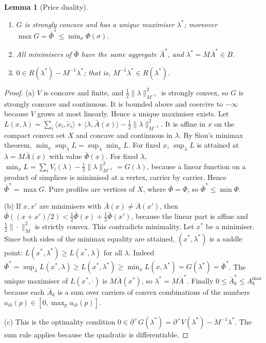 \documentclass[11pt]{article}
\newtheorem{lemma}[theorem]{Lemma}
\theoremstyle{definition}
\theoremstyle{remark}
\newcommand{\ip}[2]{\langle #1,#2\rangle}
\newcommand{\Abar}{\bar A}
\newcommand{\Amax}{A^{\max}}
\newcommand{\sd}{\partial^{+}}
\begin{document}
\begin{lemma}[Price duality]\label{lem:dual}
\begin{enumerate}[label=(\alph*)]
\item $G$ is strongly concave and has a unique maximiser $\lambda^*$; moreover $\max G=\bar\Phi^*\le\min_\sigma\Phi(\sigma)$.
\item All minimisers of $\bar\Phi$ have the same aggregate $\Abar^*$, and $\lambda^*=M\Abar^*\in B$.
\item $0\in R(\lambda^*)-M^{-1}\lambda^*$; that is, $M^{-1}\lambda^*\in R(\lambda^*)$.
\end{enumerate}
\end{lemma}
\begin{proof}
(a) $V$ is concave and finite, and $\tfrac12\|\lambda\|^2_{M^{-1}}$ is strongly convex, so $G$ is strongly concave and continuous. It is bounded above and coercive to $-\infty$ because $V$ grows at most linearly. Hence a unique maximiser exists. Let $L(x,\lambda)=\sum_i\ip{x_i}{\tilde c_i}+\ip{\lambda}{\Abar(x)}-\tfrac12\|\lambda\|^2_{M^{-1}}$. It is affine in $x$ on the compact convex set $X$ and concave and continuous in $\lambda$. By Sion's minimax theorem, $\min_x\sup_\lambda L=\sup_\lambda\min_xL$. For fixed $x$, $\sup_\lambda L$ is attained at $\lambda=M\Abar(x)$ with value $\bar\Phi(x)$. For fixed $\lambda$, $\min_xL=\sum_iV_i(\lambda)-\tfrac12\|\lambda\|^2_{M^{-1}}=G(\lambda)$, because a linear function on a product of simplices is minimised at a vertex, carrier by carrier. Hence $\bar\Phi^*=\max G$. Pure profiles are vertices of $X$, where $\bar\Phi=\Phi$, so $\bar\Phi^*\le\min\Phi$.

(b) If $x,x'$ are minimisers with $\Abar(x)\ne\Abar(x')$, then $\bar\Phi((x+x')/2)<\tfrac12\bar\Phi(x)+\tfrac12\bar\Phi(x')$, because the linear part is affine and $\tfrac12\|\cdot\|_M^2$ is strictly convex. This contradicts minimality. Let $x^*$ be a minimiser. Since both sides of the minimax equality are attained, $(x^*,\lambda^*)$ is a saddle point: $L(x^*,\lambda^*)\ge L(x^*,\lambda)$ for all $\lambda$. Indeed $\bar\Phi^*=\sup_\lambda L(x^*,\lambda)\ge L(x^*,\lambda^*)\ge\min_xL(x,\lambda^*)=G(\lambda^*)=\bar\Phi^*$. The unique maximiser of $L(x^*,\cdot)$ is $M\Abar(x^*)$, so $\lambda^*=M\Abar^*$. Finally $0\le\Abar^*_k\le\Amax_k$ because each $\Abar_k$ is a sum over carriers of convex combinations of the numbers $a_{ik}(p)\in[0,\max_pa_{ik}(p)]$.

(c) This is the optimality condition $0\in\sd G(\lambda^*)=\sd V(\lambda^*)-M^{-1}\lambda^*$. The sum rule applies because the quadratic is differentiable.
\end{proof}
\end{document}
